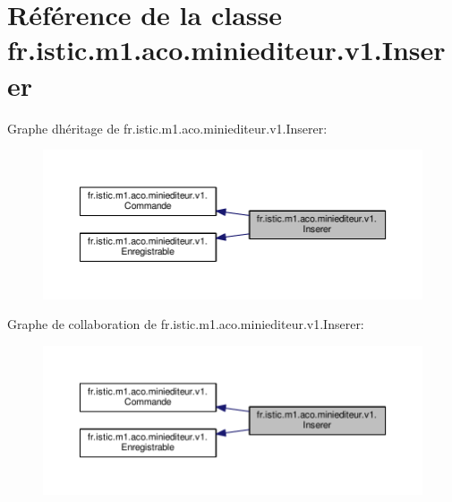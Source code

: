\hypertarget{classfr_1_1istic_1_1m1_1_1aco_1_1miniediteur_1_1v1_1_1Inserer}{}\section{Référence de la classe fr.\+istic.\+m1.\+aco.\+miniediteur.\+v1.\+Inserer}
\label{classfr_1_1istic_1_1m1_1_1aco_1_1miniediteur_1_1v1_1_1Inserer}


Graphe d\textquotesingle{}héritage de fr.\+istic.\+m1.\+aco.\+miniediteur.\+v1.\+Inserer\+:
\nopagebreak
\begin{figure}[H]
\begin{center}
\leavevmode
\includegraphics[width=350pt]{classfr_1_1istic_1_1m1_1_1aco_1_1miniediteur_1_1v1_1_1Inserer__inherit__graph}
\end{center}
\end{figure}


Graphe de collaboration de fr.\+istic.\+m1.\+aco.\+miniediteur.\+v1.\+Inserer\+:
\nopagebreak
\begin{figure}[H]
\begin{center}
\leavevmode
\includegraphics[width=350pt]{classfr_1_1istic_1_1m1_1_1aco_1_1miniediteur_1_1v1_1_1Inserer__coll__graph}
\end{center}
\end{figure}
